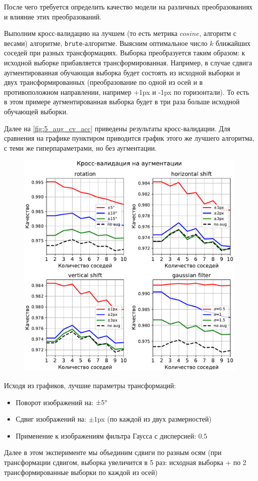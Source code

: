 \documentclass[12pt]{article}
\begin{document}
После чего требуется определить качество модели на различных преобразованиях и влияние этих преобразований.

Выполним кросс-валидацию на лучшем (то есть метрика $cosine$, алгоритм с весами) алгоритме, \verb|brute|-алгоритме. Выясним оптимальное число $k$ ближайших соседей при разных трансформациях.
Выборка преобразуется таким образом: к исходной выборке прибавляется трансформированная. Например, в случае сдвига аугментированная обучающая выборка будет состоять из исходной выборки и двух трансформированных (преобразование по одной из осей и в противоположном направлении, например +1px и -1px по горизонтали). То есть в этом примере аугментированная выборка будет в три раза больше исходной обучающей выборки.

Далее на \autoref{fig:5_aug_cv_acc} приведены результаты кросс-валидации. Для сравнения на графике пунктиром приводится график этого же лучшего алгоритма, с теми же гиперпараметрами, но без аугментации.

\begin{figure}[!h]
    \includegraphics[width=\textwidth]{5_aug_cv_acc}
    \caption{}
    \label{fig:5_aug_cv_acc}
\end{figure}

Исходя из графиков, лучшие параметры трансформаций:
\begin{itemize}
    \item Поворот изображений на: $\pm5\degree$
    \item Сдвиг изображений на: $\pm1$px (по каждой из двух размерностей)
    \item Применение к изображениям фильтра Гаусса с дисперсией: $0.5$
\end{itemize}
Далее в этом эксперименте мы объединим сдвиги по разным осям (при трансформации сдвигом, выборка увеличится в 5 раз: исходная выборка + по 2 трансформированные выборки по каждой из осей)
\end{document}
